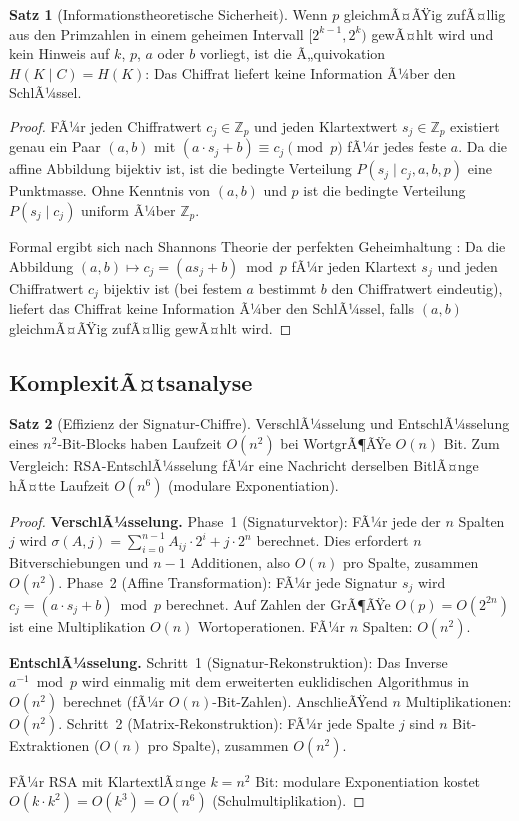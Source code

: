 ﻿\documentclass[a4paper,12pt]{article}
\theoremstyle{definition}
\newtheorem{satz}{Satz}[section]
\begin{document}
\begin{satz}[Informationstheoretische Sicherheit]
\label{satz:pqc-infotheorie}
Wenn $p$ gleichmÃ¤ÃŸig zufÃ¤llig aus den Primzahlen in einem geheimen Intervall
$[2^{k-1}, 2^k)$ gewÃ¤hlt wird und kein Hinweis auf $k$, $p$, $a$ oder $b$ vorliegt,
ist die Ã„quivokation $H(K \mid C) = H(K)$: Das Chiffrat liefert keine Information
Ã¼ber den SchlÃ¼ssel.
\end{satz}

\begin{proof}
FÃ¼r jeden Chiffratwert $c_j \in \mathbb{Z}_p$ und jeden Klartextwert $s_j \in \mathbb{Z}_p$
existiert genau ein Paar $(a, b)$ mit $(a \cdot s_j + b) \equiv c_j \pmod{p}$
fÃ¼r jedes feste $a$. Da die affine Abbildung bijektiv ist, ist die bedingte
Verteilung $P(s_j \mid c_j, a, b, p)$ eine Punktmasse. Ohne Kenntnis von $(a, b)$
und $p$ ist die bedingte Verteilung $P(s_j \mid c_j)$ uniform Ã¼ber $\mathbb{Z}_p$.

Formal ergibt sich nach Shannons Theorie der perfekten Geheimhaltung \cite{Sha49}:
Da die Abbildung $(a, b) \mapsto c_j = (a s_j + b)\bmod p$ fÃ¼r jeden Klartext $s_j$
und jeden Chiffratwert $c_j$ bijektiv ist (bei festem $a$ bestimmt $b$ den
Chiffratwert eindeutig), liefert das Chiffrat keine Information Ã¼ber den SchlÃ¼ssel,
falls $(a, b)$ gleichmÃ¤ÃŸig zufÃ¤llig gewÃ¤hlt wird.
\end{proof}

\subsection{KomplexitÃ¤tsanalyse}

\begin{satz}[Effizienz der Signatur-Chiffre]
\label{satz:pqc-kompl}
VerschlÃ¼sselung und EntschlÃ¼sselung eines $n^2$-Bit-Blocks haben Laufzeit
$O(n^2)$ bei WortgrÃ¶ÃŸe $O(n)$ Bit.
Zum Vergleich: RSA-EntschlÃ¼sselung fÃ¼r eine Nachricht derselben BitlÃ¤nge
hÃ¤tte Laufzeit $O(n^6)$ (modulare Exponentiation).
\end{satz}

\begin{proof}
\textbf{VerschlÃ¼sselung.}
Phase~1 (Signaturvektor): FÃ¼r jede der $n$ Spalten $j$ wird
$\sigma(A,j) = \sum_{i=0}^{n-1} A_{ij} \cdot 2^i + j \cdot 2^n$ berechnet.
Dies erfordert $n$ Bitverschiebungen und $n-1$ Additionen, also $O(n)$ pro Spalte,
zusammen $O(n^2)$.
Phase~2 (Affine Transformation): FÃ¼r jede Signatur $s_j$ wird
$c_j = (a \cdot s_j + b) \bmod p$ berechnet. Auf Zahlen der GrÃ¶ÃŸe $O(p) = O(2^{2n})$
ist eine Multiplikation $O(n)$ Wortoperationen. FÃ¼r $n$ Spalten: $O(n^2)$.

\textbf{EntschlÃ¼sselung.}
Schritt~1 (Signatur-Rekonstruktion): Das Inverse $a^{-1} \bmod p$ wird einmalig
mit dem erweiterten euklidischen Algorithmus in $O(n^2)$ berechnet (fÃ¼r
$O(n)$-Bit-Zahlen). AnschlieÃŸend $n$ Multiplikationen: $O(n^2)$.
Schritt~2 (Matrix-Rekonstruktion): FÃ¼r jede Spalte $j$ sind $n$ Bit-Extraktionen
($O(n)$ pro Spalte), zusammen $O(n^2)$.

FÃ¼r RSA mit KlartextlÃ¤nge $k = n^2$ Bit: modulare Exponentiation kostet
$O(k \cdot k^2) = O(k^3) = O(n^6)$ (Schulmultiplikation).
\end{proof}
\end{document}
